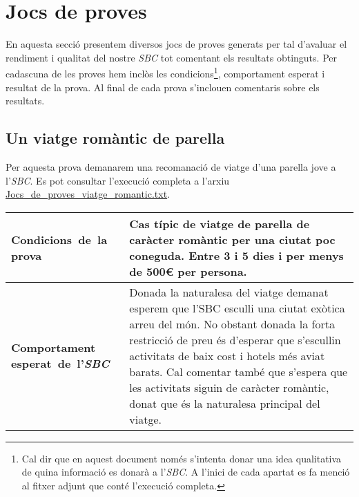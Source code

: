 \documentclass[11pt,a4paper]{article}
\begin{document}
\clearpage

\section{Jocs de proves}
En aquesta secció presentem diversos jocs de proves generats per tal d'avaluar el rendiment i qualitat del nostre \emph{SBC} tot comentant els resultats obtinguts. Per cadascuna de les proves hem inclòs les condicions\footnote{Cal dir que en aquest document només s'intenta donar una idea qualitativa de quina informació es donarà a l'\emph{SBC}. A l'inici de cada apartat es fa menció al fitxer adjunt que conté l'execució completa.}, comportament esperat i resultat de la prova. Al final de cada prova s'inclouen comentaris sobre els resultats.


\subsection{Un viatge romàntic de parella}

Per aquesta prova demanarem una recomanació de viatge d'una parella jove a l'\emph{SBC}. Es pot consultar l'execució completa a l'arxiu \url{Jocs_de_proves_viatge_romantic.txt}.

\noindent
\begin{tabular}{|p{}|p{}|}
\hline
\textbf{\mbox{Condicions de la} \mbox{prova}} & Cas típic de viatge de parella de caràcter romàntic per una ciutat poc coneguda. Entre 3 i 5 dies i per menys de 500\euro{} per persona.\\
\hline
\textbf{Comportament \mbox{esperat de l'\emph{SBC}}} & Donada la naturalesa del viatge demanat esperem que l'SBC esculli una ciutat exòtica arreu del món. No obstant donada la forta restricció de preu és d'esperar que s'escullin activitats de baix cost i hotels més aviat barats. Cal comentar també que s'espera que les activitats siguin de caràcter romàntic, donat que és la naturalesa principal del viatge. \\
\hline
\end{tabular}
\bigskip
\end{document}
